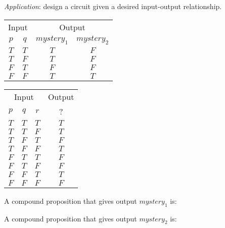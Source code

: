 
{\it Application}: design a circuit given a desired input-output relationship.

\begin{center}
\begin{tabular}{cc||cc}
\multicolumn{2}{c||}{Input}  &\multicolumn{2}{c}{Output}\\
$p$ & $q$& $mystery_1$ & $mystery_2$\\
\hline
$T$ & $T$  & $T$ & $F$\\
$T$ & $F$  & $T$ & $F$\\
$F$ & $T$  & $F$ & $F$\\
$F$ & $F$  & $T$ & $T$\\
\end{tabular}
\qquad \qquad
\begin{tabular}{ccc||c}
\multicolumn{3}{c||}{Input}  & Output\\
$p$ & $q$ & $r$  &  ?\\
\hline
$T$ & $T$  & $T$ & $T$ \\
$T$ & $T$  & $F$ & $T$ \\
$T$ & $F$  & $T$ & $F$ \\
$T$ & $F$  & $F$ & $T$ \\
$F$ & $T$  & $T$ & $F$ \\
$F$ & $T$  & $F$ & $F$ \\
$F$ & $F$  & $T$ & $T$ \\
$F$ & $F$  & $F$ & $F$ \\
\end{tabular}

\end{center}


A compound proposition that  gives output $mystery_1$ is: \underline{\phantom{\hspace{3in}}}


\vfill


A compound proposition that  gives output $mystery_2$ is: \underline{\phantom{\hspace{3in}}}


\vfill